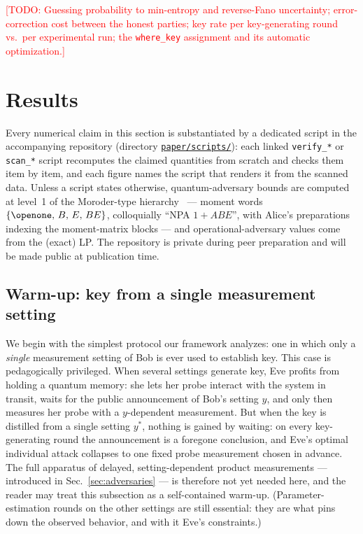 \documentclass[aps,pra,twocolumn,superscriptaddress,longbibliography,nofootinbib]{revtex4-2}
\newcommand{\wherekey}{\texttt{where\_key}}
\newcommand{\todo}[1]{\textcolor{red}{[TODO: #1]}}
\newcommand{\repoBase}{https://github.com/eliewolfe/RandomnessWinterSchool2026/blob/main/paper/scripts}
\begin{document}
\todo{Guessing probability to min-entropy and reverse-Fano uncertainty;
error-correction cost between the honest parties; key rate per
key-generating round vs.\ per experimental run; the \wherekey{}
assignment and its automatic optimization.}

\section{Results}
\label{sec:results}

Every numerical claim in this section is substantiated by a dedicated
script in the accompanying repository (directory
\href{\repoBase}{\texttt{paper/scripts/}}): each linked
\texttt{verify\_*} or \texttt{scan\_*} script recomputes the claimed
quantities from scratch and checks them item by item, and each figure
names the script that renders it from the scanned data. Unless a script
states otherwise, quantum-adversary bounds are computed at level~1 of
the Moroder-type hierarchy~\cite{Moroder2013} --- moment words
$\{\openone,\,B,\,E,\,BE\}$, colloquially ``NPA $1{+}ABE$'', with
Alice's preparations indexing the moment-matrix blocks --- and
operational-adversary values come from the (exact) LP. The repository
is private during peer preparation and will be made public at
publication time.

\subsection{Warm-up: key from a single measurement setting}
\label{sec:results-single-setting}

We begin with the simplest protocol our framework analyzes: one in which
only a \emph{single} measurement setting of Bob is ever used to establish
key. This case is pedagogically privileged. When several settings
generate key, Eve profits from holding a quantum memory: she lets her
probe interact with the system in transit, waits for the public
announcement of Bob's setting $y$, and only then measures her probe with
a $y$-dependent measurement. But when the key is distilled from a single
setting $y^{\ast}$, nothing is gained by waiting: on every
key-generating round the announcement is a foregone conclusion, and
Eve's optimal individual attack collapses to one fixed probe measurement
chosen in advance. The full apparatus of delayed, setting-dependent
product measurements --- introduced in
Sec.~\ref{sec:adversaries} --- is therefore not yet needed here,
and the reader may treat this subsection as a self-contained warm-up.
(Parameter-estimation rounds on the other settings are still essential:
they are what pins down the observed behavior, and with it Eve's
constraints.)
\end{document}
